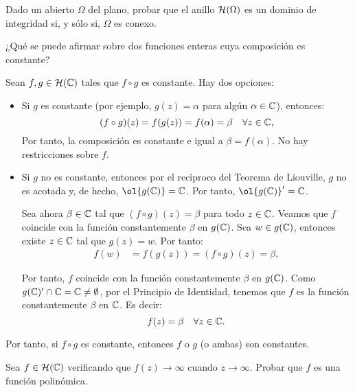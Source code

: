\begin{ejercicio}
    Dado un abierto $\Omega$ del plano, probar que el anillo $\mathcal{H}(\Omega)$ es un dominio de integridad si, y sólo si, $\Omega$ es conexo.
\end{ejercicio}

\begin{ejercicio}
    ¿Qué se puede afirmar sobre dos funciones enteras cuya composición es constante?

    Sean $f,g\in \mathcal{H}(\mathbb{C})$ tales que $f\circ g$ es constante. Hay dos opciones:
    \begin{itemize}
        \item Si $g$ es constante (por ejemplo, $g(z)=\alpha$ para algún $\alpha\in \mathbb{C}$), entonces:
        \begin{equation*}
            (f\circ g)(z) = f(g(z)) = f(\alpha) = \beta \quad \forall z\in \mathbb{C},
        \end{equation*}
        Por tanto, la composición es constante e igual a $\beta=f(\alpha)$. No hay restricciones sobre $f$.

        \item Si $g$ no es constante, entonces por el recíproco del Teorema de Liouville, $g$ no es acotada y, de hecho, $\ol{g(\bb{C})}=\bb{C}$. Por tanto, $\ol{g(\bb{C})}'=\bb{C}$.
        
        Sea ahora $\beta\in \mathbb{C}$ tal que $(f\circ g)(z)=\beta$ para todo $z\in \mathbb{C}$. Veamos que $f$ coincide con la función constantemente $\beta$ en $g(\mathbb{C})$. Sea $w\in g(\mathbb{C})$, entonces existe $z\in \mathbb{C}$ tal que $g(z)=w$. Por tanto:
        \begin{align*}
            f(w) &= f(g(z)) = (f\circ g)(z) = \beta,
        \end{align*}

        Por tanto, $f$ coincide con la función constantemente $\beta$ en $g(\mathbb{C})$. Como $g(\mathbb{C})'\cap \mathbb{C}=\mathbb{C}\neq \emptyset$, por el Principio de Identidad, tenemos que $f$ es la función constantemente $\beta$ en $\mathbb{C}$. Es decir:
        \begin{equation*}
            f(z)=\beta \quad \forall z\in \mathbb{C}.
        \end{equation*}
    \end{itemize}

    Por tanto, si $f\circ g$ es constante, entonces $f$ o $g$ (o ambas) son constantes.
\end{ejercicio}

\begin{ejercicio}
    Sea $f\in \mathcal{H}(\mathbb{C})$ verificando que $f(z)\to \infty$ cuando $z\to \infty$. Probar que $f$ es una función polinómica.
\end{ejercicio}

